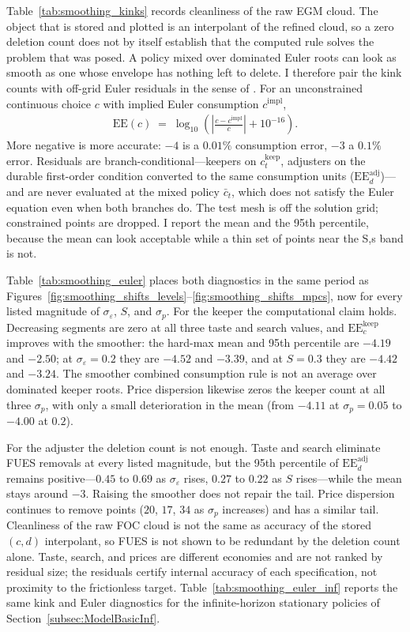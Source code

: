 Table~\ref{tab:smoothing_kinks} records cleanliness of the raw EGM cloud. The object that is stored and plotted is an interpolant of the refined cloud, so a zero deletion count does not by itself establish that the computed rule solves the problem that was posed. A policy mixed over dominated Euler roots can look as smooth as one whose envelope has nothing left to delete. I therefore pair the kink counts with off-grid Euler residuals in the sense of \citet{Judd1992-sp}. For an unconstrained continuous choice $c$ with implied Euler consumption $c^{\mathrm{impl}}$,
\begin{align}
	\mathrm{EE}(c)
	\;=\;
	\log_{10}\!\left(
		\left\lvert \frac{c - c^{\mathrm{impl}}}{c} \right\rvert
		+ 10^{-16}
	\right).
	\label{eq:judd_ee}
\end{align}
More negative is more accurate: $-4$ is a $0.01\%$ consumption error, $-3$ a $0.1\%$ error. Residuals are branch-conditional---keepers on $c_t^{\mathrm{keep}}$, adjusters on the durable first-order condition converted to the same consumption units ($\mathrm{EE}_d^{\mathrm{adj}}$)---and are never evaluated at the mixed policy $\bar c_t$, which does not satisfy the Euler equation even when both branches do. The test mesh is off the solution grid; constrained points are dropped. I report the mean and the 95th percentile, because the mean can look acceptable while a thin set of points near the S,s band is not.

Table~\ref{tab:smoothing_euler} places both diagnostics in the same period as Figures~\ref{fig:smoothing_shifts_levels}--\ref{fig:smoothing_shifts_mpcs}, now for every listed magnitude of $\sigma_\varepsilon$, $S$, and $\sigma_p$. For the keeper the computational claim holds. Decreasing segments are zero at all three taste and search values, and $\mathrm{EE}_c^{\mathrm{keep}}$ improves with the smoother: the hard-max mean and 95th percentile are $-4.19$ and $-2.50$; at $\sigma_\varepsilon=0.2$ they are $-4.52$ and $-3.39$, and at $S=0.3$ they are $-4.42$ and $-3.24$. The smoother combined consumption rule is not an average over dominated keeper roots. Price dispersion likewise zeros the keeper count at all three $\sigma_p$, with only a small deterioration in the mean (from $-4.11$ at $\sigma_p=0.05$ to $-4.00$ at $0.2$).

For the adjuster the deletion count is not enough. Taste and search eliminate FUES removals at every listed magnitude, but the 95th percentile of $\mathrm{EE}_d^{\mathrm{adj}}$ remains positive---$0.45$ to $0.69$ as $\sigma_\varepsilon$ rises, $0.27$ to $0.22$ as $S$ rises---while the mean stays around $-3$. Raising the smoother does not repair the tail. Price dispersion continues to remove points ($20$, $17$, $34$ as $\sigma_p$ increases) and has a similar tail. Cleanliness of the raw FOC cloud is not the same as accuracy of the stored $(c,d)$ interpolant, so FUES is not shown to be redundant by the deletion count alone. Taste, search, and prices are different economies and are not ranked by residual size; the residuals certify internal accuracy of each specification, not proximity to the frictionless target. Table~\ref{tab:smoothing_euler_inf} reports the same kink and Euler diagnostics for the infinite-horizon stationary policies of Section~\ref{subsec:ModelBasicInf}.

